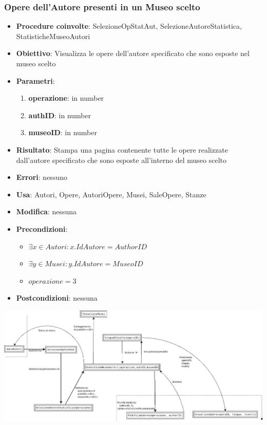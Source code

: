 \subsubsection{Opere dell’Autore presenti in un Museo scelto}
\begin{itemize}
	\item \textbf{Procedure coinvolte}: SelezioneOpStatAut, SelezioneAutoreStatistica, 
	StatisticheMuseoAutori
	\item \textbf{Obiettivo}: Visualizza le opere dell'autore specificato che sono esposte 
	nel museo scelto
	\item \textbf{Parametri}:
	\begin{enumerate}
		\item \textbf{operazione}: in number
		\item \textbf{authID}: in number
		\item \textbf{museoID}: in number
	\end{enumerate}
	\item \textbf{Risultato}: Stampa una pagina contenente tutte le opere realizzate dall'autore specificato che sono esposte all'interno del museo scelto
	\item \textbf{Errori}: nessuno
	\item \textbf{Usa}: Autori, Opere, AutoriOpere, Musei, SaleOpere, Stanze
	\item \textbf{Modifica}: nessuna
	\item \textbf{Precondizioni}:
	\begin{itemize}
		\item $\exists x \in Autori : x.IdAutore = AuthorID$
		\item $\exists y \in Musei : y.IdAutore = MuseoID$
		\item $operazione  = 3$
	\end{itemize}
	\item \textbf{Postcondizioni}: nessuna
\end{itemize}
\includegraphics[width=\textwidth]{img/statAutori-3.png}\\[1cm]

